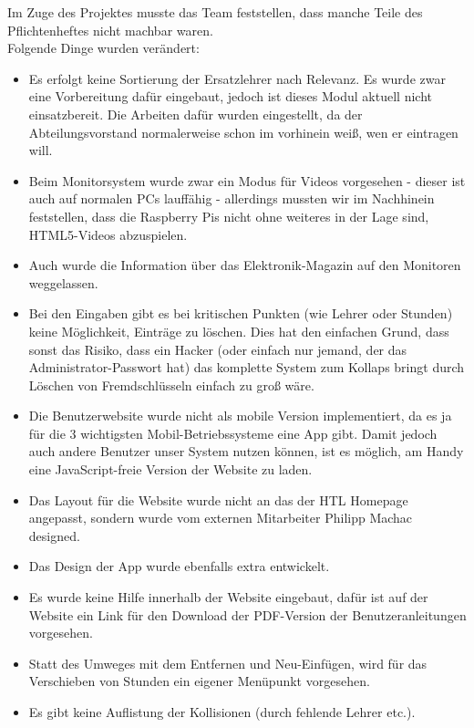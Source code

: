 Im Zuge des Projektes musste das Team feststellen, dass manche Teile des Pflichtenheftes nicht machbar waren.\\
Folgende Dinge wurden verändert:
\begin{itemize}
	\item Es erfolgt keine Sortierung der Ersatzlehrer nach Relevanz. Es wurde zwar eine Vorbereitung dafür eingebaut, jedoch ist dieses Modul aktuell nicht einsatzbereit. Die Arbeiten dafür wurden eingestellt, da der Abteilungsvorstand normalerweise schon im vorhinein weiß, wen er eintragen will.
	\item Beim Monitorsystem wurde zwar ein Modus für Videos vorgesehen - dieser ist auch auf normalen PCs lauffähig - allerdings mussten wir im Nachhinein feststellen, dass die Raspberry Pis nicht ohne weiteres in der Lage sind, HTML5-Videos abzuspielen.
	\item Auch wurde die Information über das Elektronik-Magazin auf den Monitoren weggelassen.
	\item Bei den Eingaben gibt es bei kritischen Punkten (wie Lehrer oder Stunden) keine Möglichkeit, Einträge zu löschen. Dies hat den einfachen Grund, dass sonst das Risiko, dass ein Hacker (oder einfach nur jemand, der das Administrator-Passwort hat) das komplette System zum Kollaps bringt durch Löschen von Fremdschlüsseln einfach zu groß wäre.
	\item Die Benutzerwebsite wurde nicht als mobile Version implementiert, da es ja für die 3 wichtigsten Mobil-Betriebssysteme eine App gibt. Damit jedoch auch andere Benutzer unser System nutzen können, ist es möglich, am Handy eine JavaScript-freie Version der Website zu laden.
	\item Das Layout für die Website wurde nicht an das der HTL Homepage angepasst, sondern wurde vom externen Mitarbeiter Philipp Machac designed.
	\item Das Design der App wurde ebenfalls extra entwickelt.
	\item Es wurde keine Hilfe innerhalb der Website eingebaut, dafür ist auf der Website ein Link für den Download der PDF-Version der Benutzeranleitungen vorgesehen.
	\item Statt des Umweges mit dem Entfernen und Neu-Einfügen, wird für das Verschieben von Stunden ein eigener Menüpunkt vorgesehen.
	\item Es gibt keine Auflistung der Kollisionen (durch fehlende Lehrer etc.).
\end{itemize}

